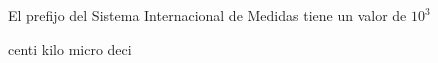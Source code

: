 
\question El prefijo \fillin \enspace del Sistema Internacional de Medidas
tiene un valor de $10^3$

  \begin{oneparchoices}
    \choice centi
    \CorrectChoice kilo
    \choice micro
    \choice deci
  \end{oneparchoices}
  \answerline[B]

